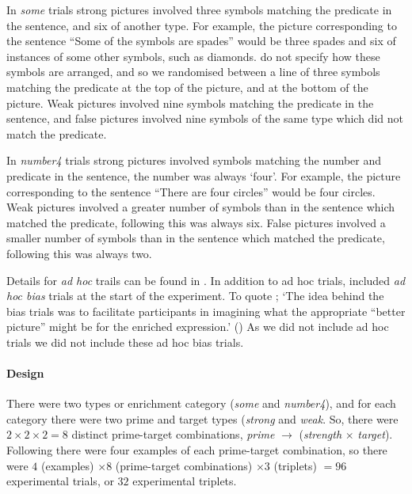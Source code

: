 \documentclass[10pt]{article}
\begin{document}
\begin{multicols}{2}
In \emph{some} trials strong pictures involved three symbols matching the predicate in the sentence, and six of another type.
For example, the picture corresponding to the sentence ``Some of the symbols are spades'' would be three spades and six of instances of some other symbols, such as diamonds.
\citeauthor{Bott:2016aa} do not specify how these symbols are arranged, and so we randomised between a line of three symbols matching the predicate at the top of the picture, and at the bottom of the picture.
Weak pictures involved nine symbols matching the predicate in the sentence, and false pictures involved nine symbols of the same type which did not match the predicate.

In \emph{number4} trials strong pictures involved symbols matching the number and predicate in the sentence, the number was always `four'.
For example, the picture corresponding to the sentence ``There are four circles'' would be four circles.
Weak pictures involved a greater number of symbols than in the sentence which matched the predicate, following \citeauthor{Bott:2016aa} this was always six.
False pictures involved a smaller number of symbols than in the sentence which matched the predicate, following \citeauthor{Bott:2016aa} this was always two.

Details for \emph{ad hoc} trails can be found in \textcite[123--124]{Bott:2016aa}.
In addition to ad hoc trials, \citeauthor{Bott:2016aa} included \emph{ad hoc bias} trials at the start of the experiment.
To quote \citeauthor{Bott:2016aa}; `The idea behind the bias trials was to facilitate participants in imagining what the appropriate ``better picture'' might be for the enriched expression.' (\citeyear[124]{Bott:2016aa})
As we did not include ad hoc trials we did not include these ad hoc bias trials.

\paragraph{Design}
There were two types or enrichment category (\emph{some} and \emph{number4}), and for each category there were two prime and target types (\emph{strong} and \emph{weak}.
So, there were \(2 \times 2 \times 2 = 8\) distinct prime-target combinations, \emph{prime} \(\rightarrow\) (\emph{strength} \(\times\) \emph{target}).
Following \citeauthor{Bott:2016aa} there were four examples of each prime-target combination, so there were \(4\) (examples) \(\times 8\) (prime-target combinations) \(\times 3\) (triplets) \(= 96\) experimental trials, or \(32\) experimental triplets.


\end{multicols}
\end{document}
